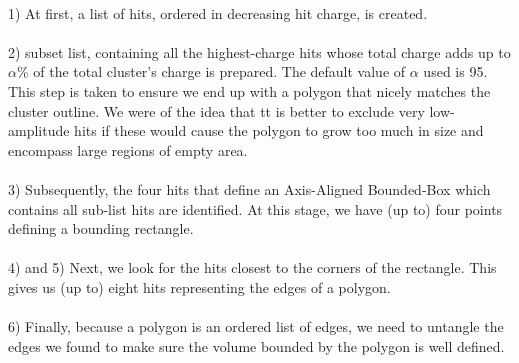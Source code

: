 \documentclass{article}
\begin{document}
\paragraph{}1) At first, a list of hits, ordered in decreasing hit charge, is created.
\paragraph{}2) subset list, containing all
the highest-charge hits whose total charge adds up to $\alpha$\% of the total cluster's charge is prepared. The 
default value of $\alpha$ used is 95. This step is taken to ensure we end up with a polygon that nicely matches
the cluster outline. We were of the idea that tt is better to exclude very low-amplitude hits if these would 
cause the polygon to grow too much in size and encompass large regions of empty area.
\paragraph{}3) Subsequently, the four hits that define an Axis-Aligned Bounded-Box which contains all sub-list hits
are identified. At this stage, we have (up to) four points defining a bounding rectangle.
\paragraph{}4) and 5) Next, we look for the hits closest to the corners of the rectangle. This gives us (up to) eight hits
representing the edges of a polygon.
\paragraph{}6) Finally, because a polygon is an ordered list of edges, we need to untangle the edges we found to make
sure the volume bounded by the polygon is well defined.
\end{document}

